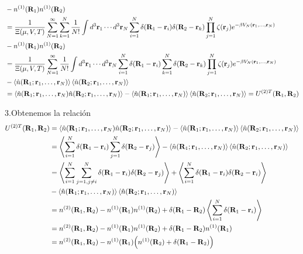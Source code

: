 \documentclass{article}
\begin{document}
\begin{align}
\begin{split}
&-n^{(1)}(\vb{R}_1)n^{(1)}(\vb{R}_2)\\
&=\frac{1}{\Xi(\mu,V,T)}\sum_{N=1}^\infty\sum_{k=1}^N \frac{1}{N!}\int d^3\vb{r}_1\cdots d^3\vb{r}_N\sum_{i=1}^N\delta(\vb{R}_1-\vb{r}_i)\delta(\vb{R}_2-\vb{r}_k)\prod_{j=1}^N\zeta(\vb{r}_j)e^{-\beta V_N(\vb{r}_1,\dots,\vb{r}_N)}\\
&-n^{(1)}(\vb{R}_1)n^{(1)}(\vb{R}_2)\\
&=\frac{1}{\Xi(\mu,V,T)}\sum_{N=1}^\infty \frac{1}{N!}\int d^3\vb{r}_1\cdots d^3\vb{r}_N\sum_{i=1}^N\delta(\vb{R}_1-\vb{r}_i)\sum_{k=1}^N\delta(\vb{R}_2-\vb{r}_k)\prod_{j=1}^N\zeta(\vb{r}_j)e^{-\beta V_N(\vb{r}_1,\dots,\vb{r}_N)}\\
&-\ev{\hat{n}(\vb{R}_1;\vb{r}_1,\dots,\vb{r}_N)}\ev{\hat{n}(\vb{R}_2;\vb{r}_1,\dots,\vb{r}_N)}\\
&=\ev{\hat{n}(\vb{R}_1;\vb{r}_1,\dots,\vb{r}_N)\hat{n}(\vb{R}_2;\vb{r}_1,\dots,\vb{r}_N)}-\ev{\hat{n}(\vb{R}_1;\vb{r}_1,\dots,\vb{r}_N)}\ev{\hat{n}(\vb{R}_2;\vb{r}_1,\dots,\vb{r}_N)}=U^{(2)T}(\vb{R}_1,\vb{R}_2)
\end{split}
\end{align}

3.Obtenemos la relación
\begin{align}
\begin{split}
U^{(2)T}(\vb{R}_1,\vb{R}_2)&=\ev{\hat{n}(\vb{R}_1;\vb{r}_1,\dots,\vb{r}_N)\hat{n}(\vb{R}_2;\vb{r}_1,\dots,\vb{r}_N)}-\ev{\hat{n}(\vb{R}_1;\vb{r}_1,\dots,\vb{r}_N)}\ev{\hat{n}(\vb{R}_2;\vb{r}_1,\dots,\vb{r}_N)}\\
&=\ev{\sum_{i=1}^N\delta(\vb{R}_1-\vb{r}_i)\sum_{j=1}^N\delta(\vb{R}_2-\vb{r}_j)}-\ev{\hat{n}(\vb{R}_1;\vb{r}_1,\dots,\vb{r}_N)}\ev{\hat{n}(\vb{R}_2;\vb{r}_1,\dots,\vb{r}_N)}\\
&=\ev{\sum_{i=1}^N\sum_{j=1,j\neq i}^N\delta(\vb{R}_1-\vb{r}_i)\delta(\vb{R}_2-\vb{r}_j)}+\ev{\sum_{i=1}^N\delta(\vb{R}_1-\vb{r}_i)\delta(\vb{R}_2-\vb{r}_i)}\\
&-\ev{\hat{n}(\vb{R}_1;\vb{r}_1,\dots,\vb{r}_N)}\ev{\hat{n}(\vb{R}_2;\vb{r}_1,\dots,\vb{r}_N)}\\
&=n^{(2)}(\vb{R}_1,\vb{R}_2)-n^{(1)}(\vb{R}_1)n^{(1)}(\vb{R}_2) +\delta(\vb{R}_1-\vb{R}_2)\ev{\sum_{i=1}^N\delta(\vb{R}_1-\vb{r}_i)}\\
&=n^{(2)}(\vb{R}_1,\vb{R}_2)-n^{(1)}(\vb{R}_1)n^{(1)}(\vb{R}_2) +\delta(\vb{R}_1-\vb{R}_2)n^{(1)}(\vb{R}_1)\\

&=n^{(2)}(\vb{R}_1,\vb{R}_2)-n^{(1)}(\vb{R}_1)\qty(n^{(1)}(\vb{R}_2) +\delta(\vb{R}_1-\vb{R}_2))
\end{split}
\end{align}
\end{document}
